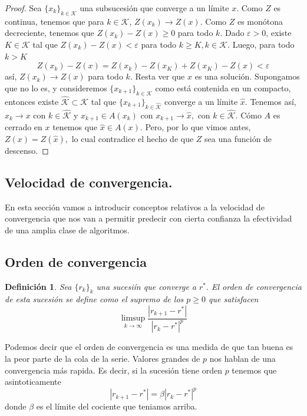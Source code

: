 \documentclass[11pt]{article}
\theoremstyle{ejstyle}
\theoremstyle{ejstyle}
\newtheorem{definicion}{Definición}
\theoremstyle{ejstyle}
\theoremstyle{ejstyle}
\theoremstyle{ejstyle}
\theoremstyle{ejstyle}
\theoremstyle{ejstyle}
\begin{document}
	\begin{proof}
		Sea $\{x_k\}_{k \in \mathcal{K}}$ una subsucesión que converge a un límite $x$. Como $Z$ es continua,
		tenemos que para $k \in \mathcal{K}$, $Z(x_k) \to Z(x).$ Como $Z$ es monótona decreciente, tenemos que 
		$Z(x_k) - Z(x) \geq 0$ para todo $k.$ Dado $\varepsilon > 0$, existe $K \in \mathcal{K}$ tal que $Z(x_k) - Z(x) < \varepsilon$ para todo $k \geq K, k \in \mathcal{K}.$ Luego, para todo $k > K$
		$$
		Z(x_k) - Z(x) =  Z(x_k) - Z(x_K) + Z(x_K) - Z(x) < \varepsilon
		$$
		así, $Z(x_k) \to Z(x)$ para todo $k$. Resta ver que $x$ es una solución. Supongamos que no lo es,
		y consideremos $\{x_{k+1}\}_{k \in \mathcal{K}}$ como está contenida en un compacto, entonces existe $\hat{\mathcal{K}} \subset \mathcal{K}$ tal que $\{x_{k+1}\}_{k \in \hat{\mathcal{K}}}$ converge a un límite $\hat{x}.$ Tenemos así, $x_{k} \to x$ con $k \in \hat{\mathcal{K}}$ y $x_{k+1} \in A(x_k)$ con $x_{k+1} \to \hat{x},$ con $k \in \hat{\mathcal{K}}.$ Cómo $A$ es cerrado en $x$ tenemos que $\hat{x} \in A(x)$. Pero, por lo que vimos antes, $Z(x) = Z(\hat{x}),$ lo cual contradice el hecho de que $Z$ sea una función de descenso.
		
	\end{proof}
	
	\subsection{Velocidad de convergencia.}
	
	En esta sección vamos a introducir conceptos relativos a la velocidad de convergencia que nos van a permitir predecir con cierta confianza la efectividad de una amplia clase de algoritmos.
	
	\subsection{Orden de convergencia}
		
	\begin{definicion}
		Sea $\{r_k\}_k$ una sucesiín que converge a $r^{*}.$ El orden de convergencia de esta sucesión se define como el supremo de los $p \geq 0$ que satisfacen
		$$
		\limsup_{k\to \infty} \frac{|r_{k+1} - r^{*}|}{|r_k - r^{*}|^{p}} 
		$$ 
	\end{definicion}
		
	Podemos decir que el orden de convergencia es una medida de que tan buena es la peor parte de la cola de la serie. Valores grandes de $p$ nos hablan de una convergencia más rapida. Es decir, si la sucesión tiene orden $p$ tenemos que asintoticamente
	$$
	|r_{k+1} - r^*| = \beta|r_k - r^*|^{p} 
	$$
	donde $\beta$ es el límite del cociente que teniamos arriba.
	
\end{document}
